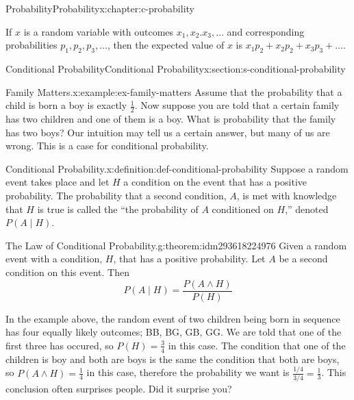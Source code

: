 \documentclass[twoside,10pt,]{book}
\numberwithin{equation}{section}
\begin{document}
\begin{chapterptx}{Probability}{}{Probability}{}{}{x:chapter:c-probability}
\begin{introduction}{}%
If \(x\) is a random variable with outcomes \(x_1, x_2. x_3, \ldots\) and corresponding probabilities \(p_1, p_2, p_3, \ldots\), then the expected value of \(x\) is \(x_1p_2+ x_2p_2+ x_3p_3+\ldots\).%
\end{introduction}%
%
%
\typeout{************************************************}
\typeout{************************************************}
%
\begin{sectionptx}{Conditional Probability}{}{Conditional Probability}{}{}{x:section:s-conditional-probability}
\begin{example}{Family Matters.}{x:example:ex-family-matters}%
Assume that the probability that a child is born a boy is exactly \(\frac{1}{2}\).  Now suppose you are told that a certain family has two children and one of them is a boy.  What is probability that the family has two boys?  Our intuition may tell us a certain answer, but many of us are wrong. This is a case for conditional probability.%
\end{example}
\begin{definition}{Conditional Probability.}{x:definition:def-conditional-probability}%
%
\label{g:notation:idm293618225552}%
Suppose a random event takes place and let \(H\) a condition on the event that has a positive probability. The probability that a second condition, \(A\), is met with knowledge that \(H\) is true is called the ``the probability of \(A\) conditioned on \(H\),'' denoted \(P(A \mid H)\).%
\end{definition}
\begin{theorem}{The Law of Conditional Probability.}{}{g:theorem:idm293618224976}%
Given a random event with a condition, \(H\), that has a positive probability. Let \(A\) be a second condition on this event.  Then%
\begin{equation*}
P(A \mid H)= \frac{P(A \wedge H)}{P(H)}
\end{equation*}
%
\end{theorem}
In the example above, the random event of two children being born in sequence has four equally likely outcomes; BB, BG, GB, GG.  We are told that one of the first three has occured, so \(P(H) =\frac{3}{4}\) in this case.   The condition that one of the children is boy and both are boys is the same the condition that both are boys, so \(P(A \wedge H) = \frac{1}{4}\) in this case, therefore the probability we want is \(\frac{1/4}{3/4} =\frac{1}{3}\).  This conclusion often surprises people.  Did it surprise you?%

\end{sectionptx}
\end{chapterptx}
\end{document}
